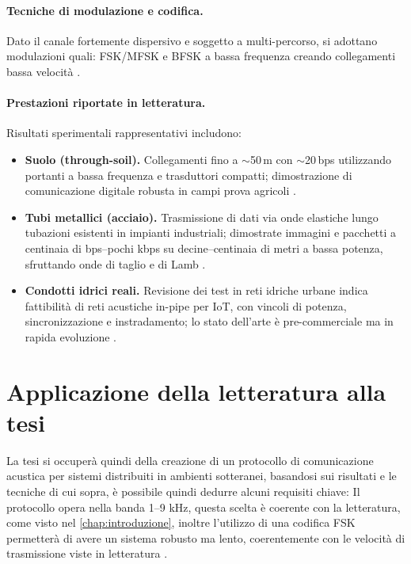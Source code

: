 \paragraph{Tecniche di modulazione e codifica.}
Dato il canale fortemente dispersivo e soggetto a multi-percorso, si adottano modulazioni quali:
FSK/MFSK e BFSK a bassa frequenza creando collegamenti bassa velocità \citep{fishta2023inpipe,farai2023mdpe}.\\


\paragraph{Prestazioni riportate in letteratura.}
Risultati sperimentali rappresentativi includono:
\begin{itemize}
    \item \textbf{Suolo (through-soil).} Collegamenti fino a $\sim$50\,m con $\sim$20\,bps utilizzando portanti a bassa 
    frequenza e trasduttori compatti; dimostrazione di comunicazione digitale robusta in campi prova agricoli \citep[sec.~3]{yang2020soil}. 
    \item \textbf{Tubi metallici (acciaio).} Trasmissione di dati via onde elastiche lungo tubazioni esistenti in impianti industriali; 
    dimostrate immagini e pacchetti a centinaia di bps–pochi kbps su decine–centinaia di metri a bassa potenza, sfruttando onde di taglio
     e di Lamb \citep{heifetz2017pipes}.
    \item \textbf{Condotti idrici reali.} Revisione dei test in reti idriche urbane indica fattibilità di reti acustiche in-pipe per
     IoT, con vincoli di potenza, sincronizzazione e instradamento; lo stato dell’arte è pre-commerciale ma in rapida evoluzione \citep{fishta2023inpipe}.
\end{itemize}

\section{Applicazione della letteratura alla tesi}
La tesi si occuperà quindi della creazione di un protocollo di comunicazione acustica per sistemi distribuiti in ambienti sotteranei, 
basandosi sui risultati e le tecniche di cui sopra, è possibile quindi dedurre alcuni requisiti chiave:
Il protocollo opera nella banda 1–9 kHz, questa scelta è coerente con la letteratura, come visto nel \autoref{chap:introduzione}, 
inoltre l'utilizzo di una codifica FSK permetterà di avere un sistema robusto ma lento, coerentemente con le velocità di trasmissione viste in letteratura \citep{fishta2023inpipe}.\\
